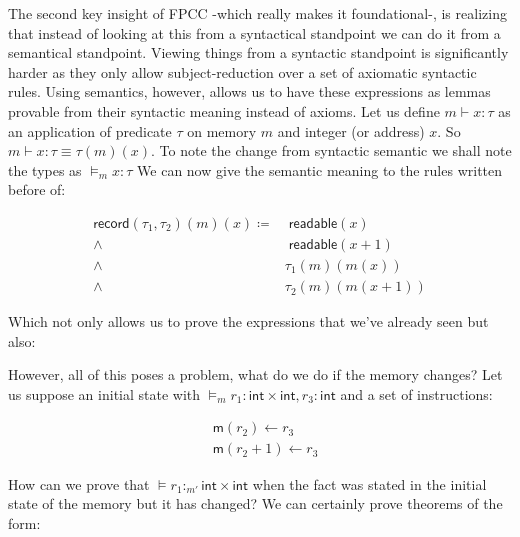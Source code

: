 \documentclass{article}
\begin{document}
The second key insight of FPCC -which really makes it 
foundational-,  is realizing that instead of looking
at this from a syntactical standpoint we can do it 
from a semantical standpoint. Viewing things from a 
syntactic standpoint is significantly harder as they
only allow subject-reduction over a set of axiomatic 
syntactic rules. Using semantics, however, allows us
to have these expressions as lemmas provable from 
their syntactic meaning instead of axioms. Let us 
define $m\vdash x:\tau$ as an application of predicate
$\tau$ on memory $m$ and integer (or address) $x$.
So $m\vdash x:\tau \equiv \tau (m)(x)$. To note the 
change from syntactic semantic we shall note the 
types as $\models_m x: \tau$ We can now give the 
semantic meaning to the rules written before of:

\begin{align*}
  \mathsf{record}(\tau_1,\tau_2)(m)(x) \coloneqq
  &\;\mathsf{readable}(x)\\ 
  \wedge&\;\mathsf{readable}(x+1)\\
  \wedge&\tau_1(m)(m(x))\\ 
  \wedge&\tau_2(m)(m(x+1))
\end{align*}

Which not only allows us to prove the expressions
that we've already seen but also:

\begin{prooftree}
\end{prooftree}

However, all of this poses a problem, what do we 
do if the memory changes? Let us suppose an initial 
state with 
$\models_m r_1: \mathsf{int}\times\mathsf{int}, r_3: 
\mathsf{int}$ and a set of instructions:

\begin{align*}
  &\mathsf{m}(r_2)\leftarrow r_3\\
  &\mathsf{m}(r_2+1)\leftarrow r_3
\end{align*}

How can we prove that 
$\models r_1:_{m'} \mathsf{int}\times\mathsf{int}$ when 
the fact was stated in the initial state of the 
memory but it has changed? We can certainly prove 
theorems of the form:

\begin{prooftree}
\end{prooftree}
\end{document}
